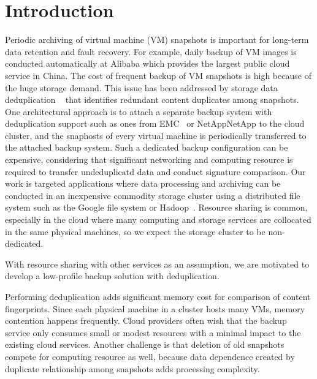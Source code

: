 \section{Introduction}
\label{sect:intro}


Periodic  archiving of virtual machine (VM) snapshots is important 
for long-term data  retention and fault recovery. 
For example, daily backup of VM images  is conducted automatically 
at Alibaba which provides the largest public cloud service in China.
The cost of frequent backup of VM snapshots is  high because of the huge storage demand.
This issue has been addressed by   storage data deduplication ~\cite{venti02,bottleneck08} that
identifies redundant content duplicates among snapshots.  
One architectural approach is to attach  a separate backup system with deduplication support such as ones
from  EMC~\cite{EMC} or NetApp{NetApp}
to the cloud cluster, and  the snaphosts of every virtual machine is   periodically transferred to
the attached backup system.  Such a dedicated backup  configuration can be expensive, 
considering that significant networking  and computing resource  is required 
to transfer undeduplicatd data and conduct signature comparison. 
Our work is targeted applications where data processing and archiving  can be conducted
in an inexpensive commodity storage cluster using a distributed file system
such as the Google file system or Hadoop~\cite{googlefs03,hdfs10}.
Resource sharing is common, especially in the cloud where many computing and storage
services are collocated in the same physical machines, so we 
expect the storage cluster to be non-dedicated.

With  resource sharing with other services as an assumption, we are motivated to develop a 
low-profile backup solution with deduplication. 


Performing deduplication adds significant  memory cost for comparison of content fingerprints. 
Since each physical machine in a cluster  hosts many VMs, memory contention happens frequently. 
Cloud providers often wish that the backup service only consumes  small or modest resources 
with a minimal impact to the existing cloud services.  Another challenge is 
that deletion of old snapshots compete for computing resource as well, because data dependence created 
by duplicate relationship among snapshots  adds processing complexity.

